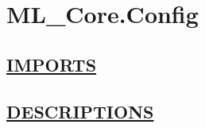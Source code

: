 \chapter*{ML\_Core.Config}
\hypertarget{ecldoc:toc:ML_Core.Config}{}

\section*{\underline{IMPORTS}}

\section*{\underline{DESCRIPTIONS}}

